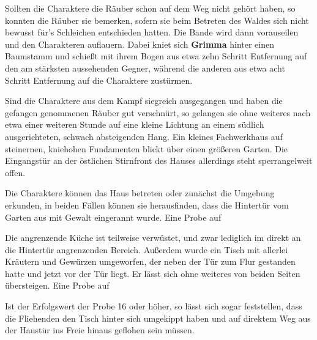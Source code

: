 Sollten die Charaktere die Räuber schon auf dem Weg nicht gehört haben, so konnten die Räuber sie bemerken, sofern sie beim Betreten des Waldes sich nicht bewusst für's Schleichen entschieden hatten. Die Bande wird dann vorauseilen und den Charakteren auflauern. Dabei kniet sich \textbf{Grimma} hinter einen Baumstamm und schießt mit ihrem Bogen aus etwa zehn Schritt Entfernung auf den am stärksten aussehenden Gegner, während die anderen aus etwa acht Schritt Entfernung auf die Charaktere zustürmen. 






Sind die Charaktere aus dem Kampf siegreich ausgegangen und haben die gefangen genommenen Räuber gut verschnürt, so gelangen sie ohne weiteres nach etwa einer weiteren Stunde auf eine kleine Lichtung an einem südlich ausgerichteten, schwach absteigenden Hang. Ein kleines Fachwerkhaus auf steinernen, kniehohen Fundamenten blickt über einen größeren Garten. Die Eingangstür an der östlichen Stirnfront des Hauses allerdings steht sperrangelweit offen.


Die Charaktere können das Haus betreten oder zunächst die Umgebung erkunden, in beiden Fällen können sie herausfinden, dass die Hintertür vom Garten aus mit Gewalt eingerannt wurde. Eine Probe auf 



Die angrenzende Küche ist teilweise verwüstet, und zwar lediglich im direkt an die Hintertür angrenzenden Bereich. Außerdem wurde ein Tisch mit allerlei Kräutern und Gewürzen umgeworfen, der neben der Tür zum Flur gestanden hatte und jetzt vor der Tür liegt. Er lässt sich ohne weiteres von beiden Seiten übersteigen. Eine Probe auf 


Ist der Erfolgswert der Probe 16 oder höher, so lässt sich sogar feststellen, dass die Fliehenden den Tisch hinter sich umgekippt haben und auf direktem Weg aus der Haustür ins Freie hinaus geflohen sein müssen. 


